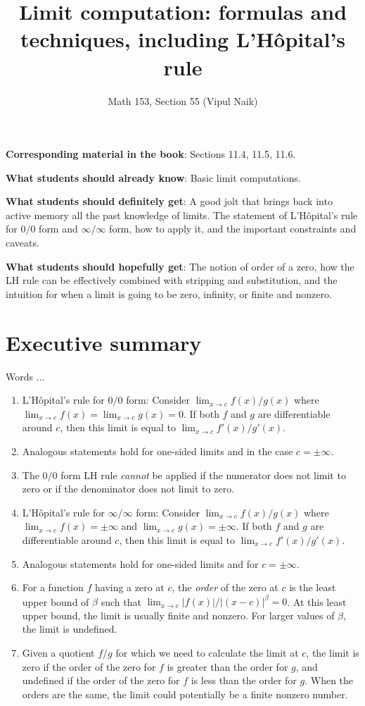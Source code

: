 \documentclass{amsart}
\title{Limit computation: formulas and techniques, including  L'H\^{o}pital's rule}
\author{Math 153, Section 55 (Vipul Naik)}
\begin{document}
\maketitle

{\bf Corresponding material in the book}: Sections 11.4, 11.5, 11.6.

{\bf What students should already know}: Basic limit computations.

{\bf What students should definitely get}: A good jolt that brings
back into active memory all the past knowledge of limits. The
statement of L'H\^{o}pital's rule for $0/0$ form and $\infty/\infty$
form, how to apply it, and the important constraints and caveats.

{\bf What students should hopefully get}: The notion of order of a
zero, how the LH rule can be effectively combined with stripping and
substitution, and the intuition for when a limit is going to be zero,
infinity, or finite and nonzero.

\section*{Executive summary}

Words ...

\begin{enumerate}
\item L'H\^{o}pital's rule for $0/0$ form: Consider $\lim_{x \to c}
  f(x)/g(x)$ where $\lim_{x \to c} f(x) = \lim_{x \to c} g(x) = 0$. If
  both $f$ and $g$ are differentiable around $c$, then this limit is
  equal to $\lim_{x \to c} f'(x)/g'(x)$.
\item Analogous statements hold for one-sided limits and in the case
  $c = \pm \infty$.
\item The $0/0$ form LH rule {\em cannot} be applied if the numerator
  does not limit to zero or if the denominator does not limit to zero.
\item L'H\^{o}pital's rule for $\infty/\infty$ form: Consider $\lim_{x
  \to c} f(x)/g(x)$ where $\lim_{x \to c} f(x) = \pm \infty$ and
  $\lim_{x \to c} g(x) = \pm \infty$. If both $f$ and $g$ are
  differentiable around $c$, then this limit is equal to $\lim_{x \to
  c} f'(x)/g'(x)$.
\item Analogous statements hold for one-sided limits and for $c = \pm
  \infty$.
\item For a function $f$ having a zero at $c$, the {\em order} of the
  zero at $c$ is the least upper bound of $\beta$ such that $\lim_{x
  \to c} |f(x)|/|(x - c)|^{\beta} = 0$. At this least upper bound, the
  limit is usually finite and nonzero. For larger values of $\beta$,
  the limit is undefined.
\item Given a quotient $f/g$ for which we need to calculate the limit
  at $c$, the limit is zero if the order of the zero for $f$ is
  greater than the order for $g$, and undefined if the order of the
  zero for $f$ is less than the order for $g$. When the orders are the
  same, the limit could potentially be a finite nonzero number.
\end{enumerate}
\end{document}
